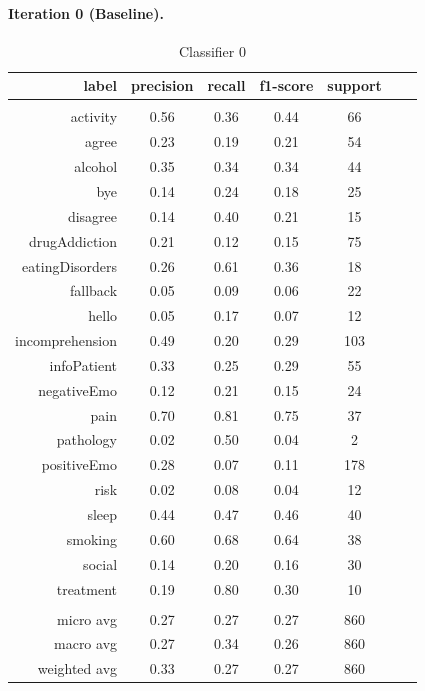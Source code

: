\documentclass[11pt]{article}
\begin{document}
\paragraph{Iteration 0 (Baseline).} 


\begin{table}[htb]
\begin{center}
\begin{tabular}{ |r|c|c|c|c|c|c| }
\hline
label & precision    & recall  & f1-score   & support\\ \hline 
\\ \hline 
activity &  0.56 & 0.36 & 0.44 &   66\\ \hline 
agree &  0.23 & 0.19 & 0.21 &   54\\ \hline 
alcohol &  0.35 & 0.34 & 0.34 &   44\\ \hline 
bye &  0.14 & 0.24 & 0.18 &   25\\ \hline 
disagree &  0.14 & 0.40 & 0.21 &   15\\ \hline 
drugAddiction &  0.21 & 0.12 & 0.15 &   75\\ \hline 
eatingDisorders &  0.26 & 0.61 & 0.36 &   18\\ \hline 
fallback &  0.05 & 0.09 & 0.06 &   22\\ \hline 
hello &  0.05 & 0.17 & 0.07 &   12\\ \hline 
incomprehension &  0.49 & 0.20 & 0.29 &  103\\ \hline 
infoPatient &  0.33 & 0.25 & 0.29 &   55\\ \hline 
negativeEmo &  0.12 & 0.21 & 0.15 &   24\\ \hline 
pain &  0.70 & 0.81 & 0.75 &   37\\ \hline 
pathology &  0.02 & 0.50 & 0.04 &    2\\ \hline 
positiveEmo &  0.28 & 0.07 & 0.11 &  178\\ \hline 
risk &  0.02 & 0.08 & 0.04 &   12\\ \hline 
sleep &  0.44 & 0.47 & 0.46 &   40\\ \hline 
smoking &  0.60 & 0.68 & 0.64 &   38\\ \hline 
social &  0.14 & 0.20 & 0.16 &   30\\ \hline 
treatment &  0.19 & 0.80 & 0.30 &   10\\ \hline 
\\ \hline 
micro avg &  0.27 & 0.27 & 0.27 &  860\\ \hline 
macro avg &  0.27 & 0.34 & 0.26 &  860\\ \hline 
weighted avg &  0.33 & 0.27 & 0.27 &  860\\ \hline 
\end{tabular}
\caption{Classifier 0}
\end{center}
\end{table}
\FloatBarrier
\end{document}
